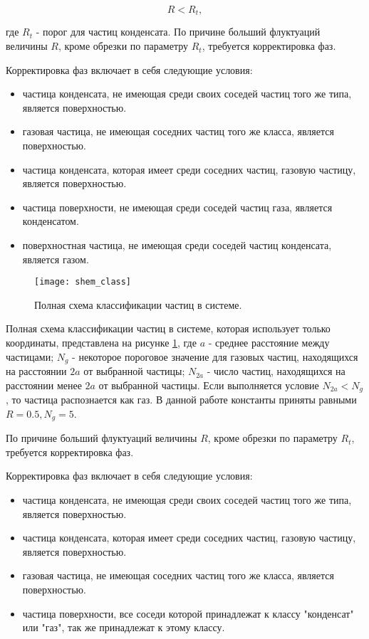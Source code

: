 \begin{equation}
R < R_t,
\end{equation}

где $R_t$ - порог для частиц конденсата.
По причине больший флуктуаций величины $R$, кроме обрезки по параметру $R_t$, требуется корректировка фаз.

Корректировка фаз включает в себя следующие условия:

\begin{itemize}
\item частица конденсата, не имеющая среди своих соседей частиц того же типа, является поверхностью.
\item газовая частица, не имеющая соседних частиц того же класса,  является поверхностью.
\item частица конденсата, которая имеет среди соседних частиц, газовую частицу, является поверхностью.
\item частица поверхности, не имеющая среди соседей частиц газа, является конденсатом.
\item поверхностная частица, не имеющая среди соседей частиц конденсата, является газом.
\end{itemize}


\begin{figure}[htbp!]
\begin{center}
\texttt{[image: shem\_class]}
\caption{Полная схема классификации частиц в системе.}
\label{risShemClass}
\end{center}
\end{figure}

Полная схема классификации частиц в системе, которая использует только координаты, представлена на рисунке \ref{risShemClass},
где $a$ - среднее расстояние между частицами; $N_g$ - некоторое пороговое значение для газовых частиц, находящихся на расстоянии $2a$ от выбранной частицы; $N_{2a}$ - число частиц, находящихся на расстоянии менее $2a$ от выбранной частицы. Если выполняется условие $N_{2a} < N_{g}$, то частица распознается как газ.
В данной работе константы приняты равными $R = 0.5, N_g = 5$.


По причине больший флуктуаций величины $R$, кроме обрезки по параметру $R_t$, требуется корректировка фаз.


Корректировка фаз включает в себя следующие условия:

\begin{itemize}
\item частица конденсата, не имеющая среди своих соседей частиц того же типа, является поверхностью.
\item частица конденсата, которая имеет среди соседних частиц, газовую частицу, является поверхностью.
\item газовая частица, не имеющая соседних частиц того же класса,  является поверхностью.
\item частица поверхности, все соседи которой принадлежат к классу "конденсат" или "газ", так же принадлежат к этому классу.
\end{itemize}

